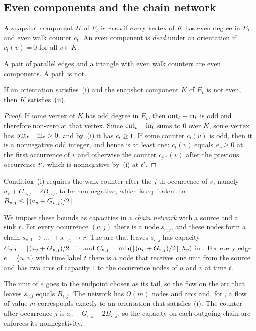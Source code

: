 \subsection{Even components and the chain network}

\begin{definition}\label{def:even}
A snapshot component $K$ of $E_t$ is \emph{even} if every vertex of $K$ has even degree in $E_t$ and even walk counter $c_t$. An even component is \emph{dead} under an orientation if $c_t(v)=0$ for all $v\in K$.
\end{definition}

A pair of parallel edges and a triangle with even walk counters are even components. A path is not.

\begin{lemma}\label{lem:noneven}
If an orientation satisfies~(i) and the snapshot component $K$ of $E_t$ is not even, then $K$ satisfies~(ii).
\end{lemma}

\begin{proof}
If some vertex of $K$ has odd degree in $E_t$, then $\mathrm{out}_t-\mathrm{in}_t$ is odd and therefore non-zero at that vertex. Since $\mathrm{out}_t-\mathrm{in}_t$ sums to $0$ over $K$, some vertex has $\mathrm{out}_t-\mathrm{in}_t>0$, and by~(i) it has $c_t\ge1$. If some counter $c_t(v)$ is odd, then it is a nonnegative odd integer, and hence is at least one: $c_t(v)$ equals $a_v\ge0$ at the first occurrence of $v$ and otherwise the counter $c_{t'^+}(v)$ after the previous occurrence $t'$, which is nonnegative by~(i) at $t'$.
\end{proof}

Condition~(i) requires the walk counter after the $j$-th occurrence of $v$, namely $a_v+G_{v,j}-2B_{v,j}$, to be non-negative, which is equivalent to $B_{v,j}\le\lfloor (a_v+G_{v,j})/2\rfloor$.

We impose these bounds as capacities in a \emph{chain network} with a source and a sink $r$. For every occurrence $(v,j)$ there is a node $s_{v,j}$, and these nodes form a chain $s_{v,1}\to\dots\to s_{v,q_v}\to r$. The arc that leaves $s_{v,j}$ has capacity $C_{v,j}=\lfloor (a_v+G_{v,j})/2\rfloor$ in \FREE{} and $C_{v,j}=\min(\lfloor (a_v+G_{v,j})/2\rfloor,h_v)$ in \FIX{}. For every edge $e=\{u,v\}$ with time label $t$ there is a node that receives one unit from the source and has two arcs of capacity $1$ to the occurrence nodes of $u$ and $v$ at time $t$.

The unit of $e$ goes to the endpoint chosen as its tail, so the flow on the arc that leaves $s_{v,j}$ equals $B_{v,j}$. The network has $O(m)$ nodes and arcs and, for \FREE{}, a flow of value $m$ corresponds exactly to an orientation that satisfies~(i). The counter after occurrence $j$ is $a_v+G_{v,j}-2B_{v,j}$, so the capacity on each outgoing chain arc enforces its nonnegativity.

